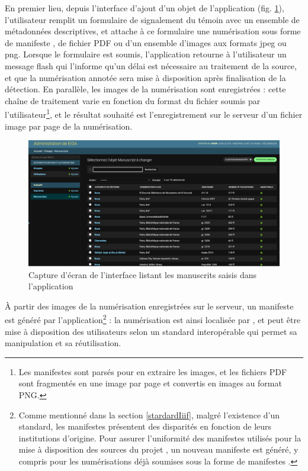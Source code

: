 	En premier lieu, depuis l'interface d'ajout d'un objet de l'application \eida (fig. \ref{fig:eida_list}), l'utilisateur remplit un formulaire de signalement du témoin avec un ensemble de métadonnées descriptives, et attache à ce formulaire une numérisation sous forme de manifeste \iiif, de fichier PDF ou d'un ensemble d'images aux formats \acrshort{jpeg} ou \acrshort{png}. Lorsque le formulaire est soumis, l'application retourne à l'utilisateur un message flash qui l'informe qu'un délai est nécessaire au traitement de la source, et que la numérisation annotée sera mise à disposition après finalisation de la détection. En parallèle, les images de la numérisation sont enregistrées : cette chaîne de traitement varie en fonction du format du fichier soumis par l'utilisateur\footnote{Les manifestes \iiif sont parsés pour en extraire les images, et les fichiers PDF sont fragmentés en une image par page et convertis en images au format PNG.}, et le résultat souhaité est l'enregistrement sur le serveur d'un fichier image par page de la numérisation.
	
	\begin{figure}[h]
		\centering
		\includegraphics[width=16cm]{images/eida_list.png}
		\caption{Capture d'écran de l'interface listant les manuscrits saisis dans l'application \eida}
		\label{fig:eida_list}
	\end{figure}

	À partir des images de la numérisation enregistrées sur le serveur, un manifeste \iiif est généré par l'application\footnote{Comme mentionné dans la section \ref{stardardIiif}, malgré l'existence d'un standard, les manifestes \iiif présentent des disparités en fonction de leurs institutions d'origine. Pour assurer l'uniformité des manifestes utilisés pour la mise à disposition des sources du projet \eida, un nouveau manifeste est généré, y compris pour les numérisations déjà soumises sous la forme de manifestes \iiif.} : la numérisation est ainsi localisée par \URL, et peut être mise à disposition des utilisateurs selon un standard interopérable qui permet sa manipulation et sa réutilisation.
	
